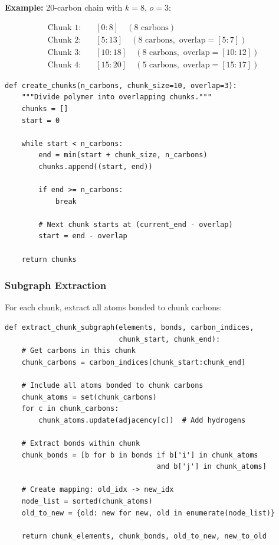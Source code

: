 \documentclass[11pt,a4paper]{article}
\begin{document}
\textbf{Example:} 20-carbon chain with $k=8$, $o=3$:

\begin{align*}
\text{Chunk 1:} & \quad [0:8] \quad (8 \text{ carbons}) \\
\text{Chunk 2:} & \quad [5:13] \quad (8 \text{ carbons}, \text{ overlap} = [5:7]) \\
\text{Chunk 3:} & \quad [10:18] \quad (8 \text{ carbons}, \text{ overlap} = [10:12]) \\
\text{Chunk 4:} & \quad [15:20] \quad (5 \text{ carbons}, \text{ overlap} = [15:17])
\end{align*}

\begin{lstlisting}[caption={Chunk Creation Implementation}]
def create_chunks(n_carbons, chunk_size=10, overlap=3):
    """Divide polymer into overlapping chunks."""
    chunks = []
    start = 0

    while start < n_carbons:
        end = min(start + chunk_size, n_carbons)
        chunks.append((start, end))

        if end >= n_carbons:
            break

        # Next chunk starts at (current_end - overlap)
        start = end - overlap

    return chunks
\end{lstlisting}

\subsubsection{Subgraph Extraction}

For each chunk, extract all atoms bonded to chunk carbons:

\begin{lstlisting}[caption={Subgraph Extraction}]
def extract_chunk_subgraph(elements, bonds, carbon_indices,
                           chunk_start, chunk_end):
    # Get carbons in this chunk
    chunk_carbons = carbon_indices[chunk_start:chunk_end]

    # Include all atoms bonded to chunk carbons
    chunk_atoms = set(chunk_carbons)
    for c in chunk_carbons:
        chunk_atoms.update(adjacency[c])  # Add hydrogens

    # Extract bonds within chunk
    chunk_bonds = [b for b in bonds if b['i'] in chunk_atoms
                                    and b['j'] in chunk_atoms]

    # Create mapping: old_idx -> new_idx
    node_list = sorted(chunk_atoms)
    old_to_new = {old: new for new, old in enumerate(node_list)}

    return chunk_elements, chunk_bonds, old_to_new, new_to_old
\end{lstlisting}
\end{document}
